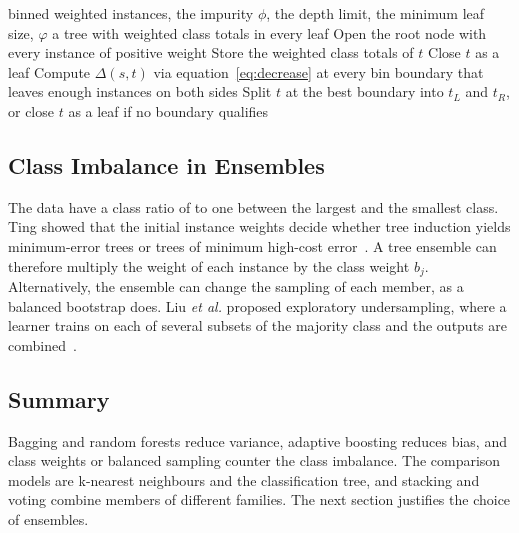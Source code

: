 \documentclass[10pt,conference]{IEEEtran}
\begin{document}
\begin{algorithm}[b]
\caption{Induction of a weighted classification tree}
\label{alg:tree}
\begin{algorithmic}[1]
\Require binned weighted instances, the impurity $\phi$, the depth limit, the minimum leaf size, $\varphi$
\Ensure a tree with weighted class totals in every leaf
\State Open the root node with every instance of positive weight
    \State Store the weighted class totals of $t$
        \State Close $t$ as a leaf
    \Else
            \State Compute $\Delta(s, t)$ via equation~\eqref{eq:decrease} at every bin boundary that leaves enough instances on both sides
        \EndFor
        \State Split $t$ at the best boundary into $t_L$ and $t_R$, or close $t$ as a leaf if no boundary qualifies
    \EndIf
\EndFor
\end{algorithmic}
\end{algorithm}

\subsection{Class Imbalance in Ensembles}
\label{sec:bg-imbalance}

The data have a class ratio of \ratioImbalance{} to one between the largest and the smallest class. Ting showed that the initial instance weights decide whether tree induction yields minimum-error trees or trees of minimum high-cost error~\cite{ting2002}. A tree ensemble can therefore multiply the weight of each instance by the class weight $b_j$. Alternatively, the ensemble can change the sampling of each member, as a balanced bootstrap does. Liu \textit{et al.} proposed exploratory undersampling, where a learner trains on each of several subsets of the majority class and the outputs are combined~\cite{liu2009}.

\subsection{Summary}
\label{sec:bg-summary}

Bagging and random forests reduce variance, adaptive boosting reduces bias, and class weights or balanced sampling counter the class imbalance. The comparison models are k-nearest neighbours and the classification tree, and stacking and voting combine members of different families. The next section justifies the choice of ensembles.
\end{document}

